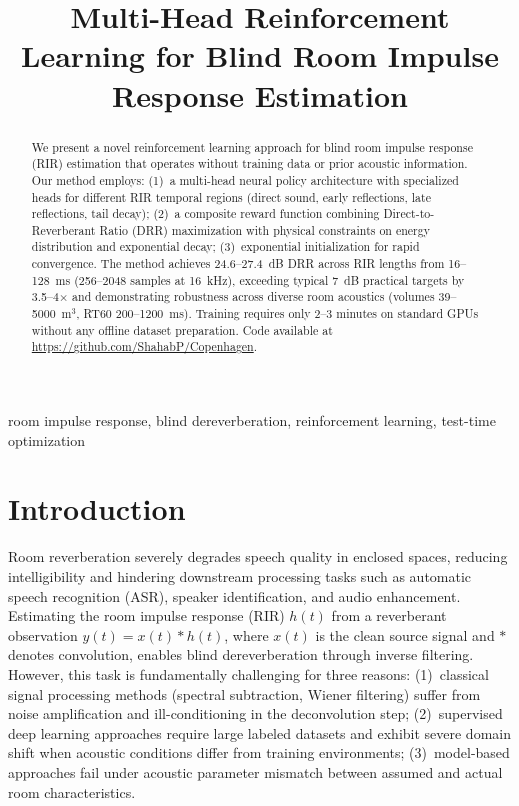 \documentclass[10pt,conference]{IEEEtran}
\begin{document}
\title{Multi-Head Reinforcement Learning for Blind Room Impulse Response Estimation}

\author{
}

\maketitle

\begin{abstract}
We present a novel reinforcement learning approach for blind room impulse response (RIR) estimation that operates without training data or prior acoustic information. Our method employs: (1)~a multi-head neural policy architecture with specialized heads for different RIR temporal regions (direct sound, early reflections, late reflections, tail decay); (2)~a composite reward function combining Direct-to-Reverberant Ratio (DRR) maximization with physical constraints on energy distribution and exponential decay; (3)~exponential initialization for rapid convergence. The method achieves 24.6--27.4~dB DRR across RIR lengths from 16--128~ms (256--2048 samples at 16~kHz), exceeding typical 7~dB practical targets by 3.5--4$\times$ and demonstrating robustness across diverse room acoustics (volumes 39--5000~m$^3$, RT60 200--1200~ms). Training requires only 2--3 minutes on standard GPUs without any offline dataset preparation. Code available at \url{https://github.com/ShahabP/Copenhagen}.
\end{abstract}

\begin{IEEEkeywords}
room impulse response, blind dereverberation, reinforcement learning, test-time optimization
\end{IEEEkeywords}

\section{Introduction}

Room reverberation severely degrades speech quality in enclosed spaces, reducing intelligibility and hindering downstream processing tasks such as automatic speech recognition (ASR), speaker identification, and audio enhancement. Estimating the room impulse response (RIR) $h(t)$ from a reverberant observation $y(t) = x(t) * h(t)$, where $x(t)$ is the clean source signal and $*$ denotes convolution, enables blind dereverberation through inverse filtering. However, this task is fundamentally challenging for three reasons: (1)~classical signal processing methods (spectral subtraction, Wiener filtering) suffer from noise amplification and ill-conditioning in the deconvolution step; (2)~supervised deep learning approaches require large labeled datasets and exhibit severe domain shift when acoustic conditions differ from training environments; (3)~model-based approaches fail under acoustic parameter mismatch between assumed and actual room characteristics.
\end{document}
